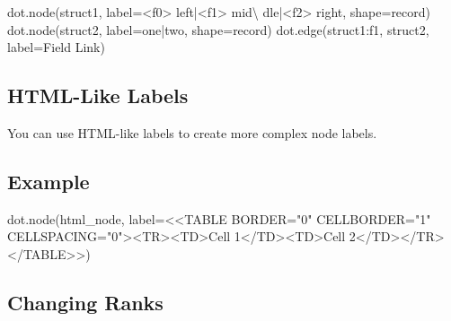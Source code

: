 \documentclass[
  letterpaper,
  DIV=11,
  numbers=noendperiod]{scrreprt}
\newenvironment{Shaded}{\begin{snugshade}}{\end{snugshade}}
\newcommand{\NormalTok}[1]{\textcolor[rgb]{0.00,0.23,0.31}{#1}}
\newcommand{\OperatorTok}[1]{\textcolor[rgb]{0.37,0.37,0.37}{#1}}
\newcommand{\StringTok}[1]{\textcolor[rgb]{0.13,0.47,0.30}{#1}}
\begin{document}
\begin{Shaded}
\begin{Highlighting}[]
\NormalTok{dot.node(}\StringTok{\textquotesingle{}struct1\textquotesingle{}}\NormalTok{, label}\OperatorTok{=}\StringTok{\textquotesingle{}\textless{}f0\textgreater{} left|\textless{}f1\textgreater{} mid\textbackslash{} dle|\textless{}f2\textgreater{} right\textquotesingle{}}\NormalTok{, shape}\OperatorTok{=}\StringTok{\textquotesingle{}record\textquotesingle{}}\NormalTok{)}
\NormalTok{dot.node(}\StringTok{\textquotesingle{}struct2\textquotesingle{}}\NormalTok{, label}\OperatorTok{=}\StringTok{\textquotesingle{}one|two\textquotesingle{}}\NormalTok{, shape}\OperatorTok{=}\StringTok{\textquotesingle{}record\textquotesingle{}}\NormalTok{)}
\NormalTok{dot.edge(}\StringTok{\textquotesingle{}struct1:f1\textquotesingle{}}\NormalTok{, }\StringTok{\textquotesingle{}struct2\textquotesingle{}}\NormalTok{, label}\OperatorTok{=}\StringTok{\textquotesingle{}Field Link\textquotesingle{}}\NormalTok{)}
\end{Highlighting}
\end{Shaded}

\subsection{HTML-Like Labels}\label{html-like-labels}

You can use HTML-like labels to create more complex node labels.

\subsection{Example}\label{example-49}

\begin{Shaded}
\begin{Highlighting}[]
\NormalTok{dot.node(}\StringTok{\textquotesingle{}html\_node\textquotesingle{}}\NormalTok{, label}\OperatorTok{=}\StringTok{\textquotesingle{}\textless{}\textless{}TABLE BORDER="0" CELLBORDER="1" CELLSPACING="0"\textgreater{}\textless{}TR\textgreater{}\textless{}TD\textgreater{}Cell 1\textless{}/TD\textgreater{}\textless{}TD\textgreater{}Cell 2\textless{}/TD\textgreater{}\textless{}/TR\textgreater{}\textless{}/TABLE\textgreater{}\textgreater{}\textquotesingle{}}\NormalTok{)}
\end{Highlighting}
\end{Shaded}

\subsection{Changing Ranks}\label{changing-ranks}
\end{document}
